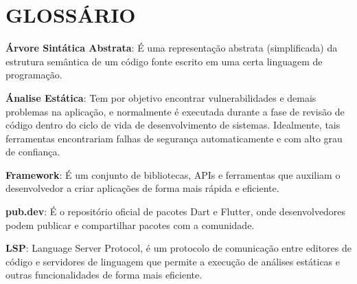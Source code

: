 



\chapter*{GLOSSÁRIO}

{ \setlength{\parindent}{0pt} %

\textbf{Árvore Sintática Abstrata}: É uma representação abstrata (simplificada) da estrutura semântica de um código fonte escrito em uma certa linguagem de programação.

\textbf{Ánalise Estática}: Tem por objetivo encontrar vulnerabilidades e demais problemas na aplicação, e normalmente é executada durante a fase de revisão de código dentro do ciclo de vida de desenvolvimento de sistemas. Idealmente, tais ferramentas encontrariam falhas de segurança automaticamente e com alto grau de confiança.

\textbf{Framework}: É um conjunto de bibliotecas, APIs e ferramentas que auxiliam o desenvolvedor a criar aplicações de forma mais rápida e eficiente.

\textbf{pub.dev}: É o repositório oficial de pacotes Dart e Flutter, onde desenvolvedores podem publicar e compartilhar pacotes com a comunidade.

\textbf{LSP}: Language Server Protocol, é um protocolo de comunicação entre editores de código e servidores de linguagem que permite a execução de análises estáticas e outras funcionalidades de forma mais eficiente.

} %
